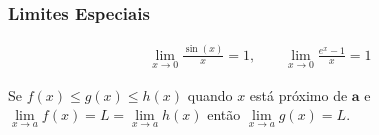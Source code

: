 \begin{tcolorbox}
\subsubsection*{Limites Especiais}

\begin{align*}
    \lim\limits_{x \to 0}\frac{\sin(x)}{x}=1, \qquad
    \lim\limits_{x \to 0}\frac{e^x-1}{x}=1
\end{align*}
\end{tcolorbox}
\begin{tcolorbox}
\begin{teorema} Se $f(x)\leq g(x)\leq h(x)$ quando $x$ está próximo de $\textbf{a}$ e $\lim\limits_{x \to a}f(x)=L=\lim\limits_{x \to a}h(x)$ então $\lim\limits_{x \to a}g(x)=L$.
\end{teorema}
\begin{figure}[H]
\centering

\end{figure}
\end{tcolorbox}

